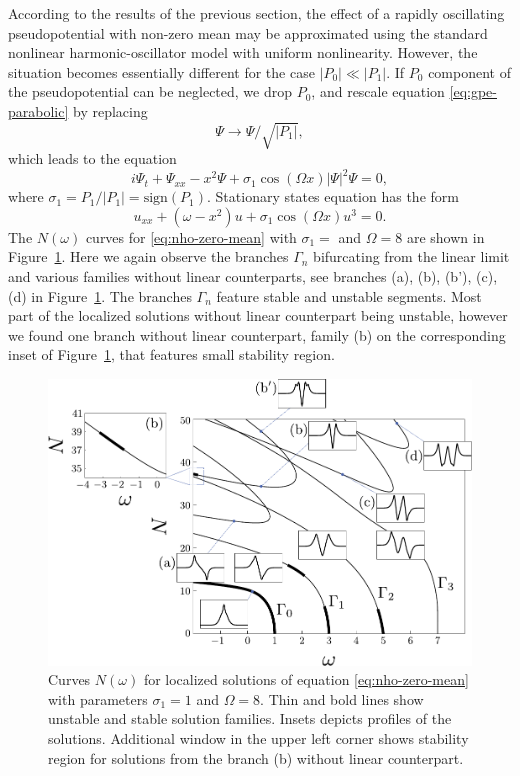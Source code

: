 According to the results of the previous section, the effect of a rapidly oscillating pseudopotential with non-zero mean may be approximated using the standard nonlinear harmonic-oscillator model with uniform nonlinearity.
However, the situation becomes essentially different for the case $|P_0| \ll |P_1|$.
If $P_0$ component of the pseudopotential can be neglected, we drop $P_0$, and rescale equation \eqref{eq:gpe-parabolic} by replacing
\begin{equation}
	\Psi \to \Psi / \sqrt{|P_1|},
\end{equation}
which leads to the equation
\begin{equation}
	i \Psi_t + \Psi_{xx} - x^2 \Psi + \sigma_1 \cos (\Omega x) |\Psi|^2 \Psi = 0,
\label{eq:gpe-zero-mean}
\end{equation}
where $\sigma_1 = P_1 / |P_1| = \mathrm{sign}(P_1)$.
Stationary states equation has the form
\begin{equation}
	u_{xx} + (\omega - x^2) u + \sigma_1 \cos (\Omega x) u^3 = 0.
\label{eq:nho-zero-mean}
\end{equation}
The $N(\omega)$ curves for \eqref{eq:nho-zero-mean} with $\sigma_1 = $ and $\Omega = 8$ are shown in Figure~\ref{fig:stability-nho-zero-mean}.
Here we again observe the branches $\Gamma_n$ bifurcating from the linear limit and various families without linear counterparts, see branches (a), (b), (b'), (c), (d) in Figure~\ref{fig:stability-nho-zero-mean}.
The branches $\Gamma_n$ feature stable and unstable segments.
Most part of the localized solutions without linear counterpart being unstable, however we found one branch  without linear counterpart, family (b) on the corresponding inset of Figure~\ref{fig:stability-nho-zero-mean}, that features small stability region.

\begin{figure}[h]
\centering
	\includegraphics[scale = 1]{pic/branches for cosine nho, zero mean}
	\caption{
		Curves $N(\omega)$ for localized solutions of equation \eqref{eq:nho-zero-mean} with parameters $\sigma_1 = 1$ and $\Omega = 8$.
		Thin and bold lines show unstable and stable solution families.
		Insets depicts profiles of the solutions.
		Additional window in the upper left corner shows stability region for solutions from the branch (b) without linear counterpart.
	}
\label{fig:stability-nho-zero-mean}
\end{figure}

